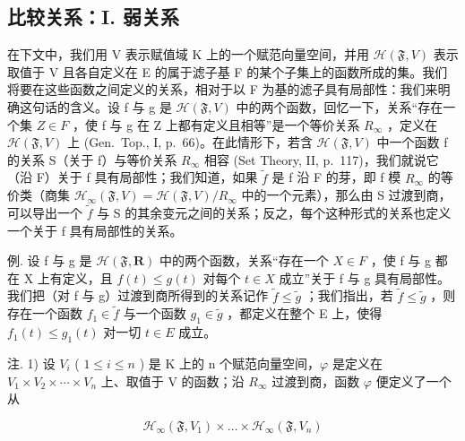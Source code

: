 \subsection{比较关系：I. 弱关系}

在下文中，我们用 V 表示赋值域 K 上的一个赋范向量空间，并用 \(\mathcal{H}(\mathfrak{F}, V)\) 表示取值于 V 且各自定义在 E 的属于滤子基 F 的某个子集上的函数所成的集。我们将要在这些函数之间定义的关系，相对于以 F 为基的滤子具有局部性：我们来明确这句话的含义。设 f 与 g 是 \(\mathcal{H}(\mathfrak{F}, V)\) 中的两个函数，回忆一下，关系“存在一个集 \(Z \in F\) ，使 f 与 g 在 Z 上都有定义且相等”是一个等价关系 \(R_{\infty}\) ，定义在 \(\mathcal{H}(\mathfrak{F}, V)\) 上 (Gen.~Top., I, p.~66)。在此情形下，若含 \(\mathcal{H}(\mathfrak{F}, V)\) 中一个函数 f 的关系 S（关于 f）与等价关系 \(R_{\infty}\) 相容 (Set Theory, II, p.~117)，我们就说它（沿 F）关于 f 具有局部性；我们知道，如果 \(\tilde{f}\) 是 f 沿 F 的芽，即 f 模 \(R_{\infty}\) 的等价类（商集 \(\mathcal{H}_{\infty}(\mathfrak{F}, V) = \mathcal{H}(\mathfrak{F}, V)/R_{\infty}\) 中的一个元素），那么由 S 过渡到商，可以导出一个 \(\tilde{f}\) 与 S 的其余变元之间的关系；反之，每个这种形式的关系也定义一个关于 f 具有局部性的关系。

例. 设 f 与 g 是 \(\mathcal{H}(\mathfrak{F},\mathbf{R})\) 中的两个函数，关系“存在一个 \(X \in F\) ，使 f 与 g 都在 X 上有定义，且 \(f(t) \leqslant g(t)\) 对每个 \(t \in X\) 成立”关于 f 与 g 具有局部性。我们把（对 f 与 g）过渡到商所得到的关系记作 \(\tilde{f} \leqslant \tilde{g}\) ；我们指出，若 \(\tilde{f} \leqslant \tilde{g}\) ，则存在一个函数 \(f_{1} \in \tilde{f}\) 与一个函数 \(g_{1} \in \tilde{g}\) ，都定义在整个 E 上，使得 \(f_{1}(t) \leqslant g_{1}(t)\) 对一切 \(t \in E\) 成立。

注. 1) 设 \(V_{i}\) ( \(1 \leqslant i \leqslant n\) ) 是 K 上的 n 个赋范向量空间，\(\varphi\) 是定义在 \(V_{1} \times V_{2} \times \cdots \times V_{n}\) 上、取值于 V 的函数；沿 \(R_{\infty}\) 过渡到商，函数 \(\varphi\) 便定义了一个从

\[
\mathcal {H} _ {\infty} (\mathfrak {F}, V _ {1}) \times \dots \times \mathcal {H} _ {\infty} (\mathfrak {F}, V _ {n})
\]

